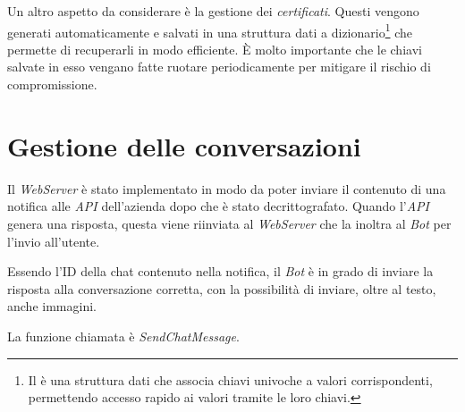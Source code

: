 Un altro aspetto da considerare è la gestione dei \emph{certificati}.
Questi vengono generati automaticamente e salvati in una struttura dati a dizionario\footnote{Il è una struttura dati che associa chiavi univoche a valori corrispondenti, permettendo accesso rapido ai valori tramite le loro chiavi.} che permette di recuperarli in modo efficiente.
È molto importante che le chiavi salvate in esso vengano fatte ruotare periodicamente per mitigare il rischio di compromissione.


\section{Gestione delle conversazioni}

Il \emph{WebServer} è stato implementato in modo da poter inviare il contenuto di una notifica alle \emph{API} dell'azienda dopo che è stato decrittografato.
Quando l'\emph{API} genera una risposta, questa viene riinviata al \emph{WebServer} che la inoltra al \emph{Bot} per l'invio all'utente.

Essendo l'ID della chat contenuto nella notifica, il \emph{Bot} è in grado di inviare la risposta alla conversazione corretta, con la possibilità di inviare, oltre al testo, anche immagini.

\noindent La funzione chiamata è \emph{SendChatMessage}.

